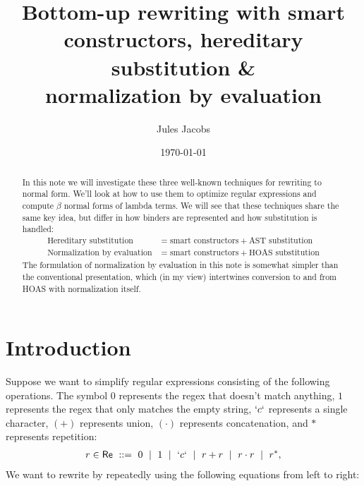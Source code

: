
\newcommand{\id}[1]{\lstinline\|#1\|}

\title{Bottom-up rewriting with smart constructors, hereditary substitution \& \\normalization by evaluation}
\author{\large{Jules Jacobs}}
\date{\normalsize	\today}


\maketitle
{}

\begin{abstract}
  \noindent
  In this note we will investigate these three well-known techniques for rewriting to normal form. We'll look at how to use them to optimize regular expressions and compute $\beta$ normal forms of lambda terms. We will see that these techniques share the same key idea, but differ in how binders are represented and how substitution is handled:
  \begin{align*}
    \text{Hereditary substitution} &= \text{smart constructors} + \text{AST substitution} \\
    \text{Normalization by evaluation} &= \text{smart constructors} + \text{HOAS substitution}
  \end{align*}
  The formulation of normalization by evaluation in this note is somewhat simpler than the conventional presentation, which (in my view) intertwines conversion to and from HOAS with normalization itself.
\end{abstract}

\tableofcontents

\section{Introduction}

\newcommand{\emp}{0}
\newcommand{\eps}{1}
\newcommand{\seq}{\cdot}
\newcommand{\md}{\ \mid \ }

Suppose we want to simplify regular expressions consisting of the following operations. The symbol $0$ represents the regex that doesn't match anything, $1$ represents the regex that only matches the empty string, $`c`$ represents a single character, $(+)$ represents union, $(\cdot)$ represents concatenation, and $*$ represents repetition:
\begin{align*}
  r \in \mathsf{Re} \ ::=\  \emp \md \eps \md `c` \md r + r \md r \seq r \md r^*,
\end{align*}
We want to rewrite by repeatedly using the following equations from left to right: \vspace{-0.7cm}

